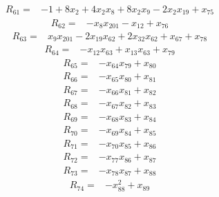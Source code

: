 {\begin{align*}
R_{61} ={}& -1 + 8x_{2} + 4x_{2} x_{8} + 8x_{2} x_{9} - 2x_{2} x_{19} + x_{75}
\end{align*}
\begin{align*}
R_{62} ={}& -x_{8} x_{201} - x_{12} + x_{76}
\end{align*}
\begin{align*}
R_{63} ={}& x_{9} x_{201} - 2x_{19} x_{62} + 2x_{32} x_{62} + x_{67} + x_{78}
\end{align*}
\begin{align*}
R_{64} ={}& -x_{12} x_{63} + x_{13} x_{63} + x_{79}
\end{align*}
\begin{align*}
R_{65} ={}& -x_{64} x_{79} + x_{80}
\end{align*}
\begin{align*}
R_{66} ={}& -x_{65} x_{80} + x_{81}
\end{align*}
\begin{align*}
R_{67} ={}& -x_{66} x_{81} + x_{82}
\end{align*}
\begin{align*}
R_{68} ={}& -x_{67} x_{82} + x_{83}
\end{align*}
\begin{align*}
R_{69} ={}& -x_{68} x_{83} + x_{84}
\end{align*}
\begin{align*}
R_{70} ={}& -x_{69} x_{84} + x_{85}
\end{align*}
\begin{align*}
R_{71} ={}& -x_{70} x_{85} + x_{86}
\end{align*}
\begin{align*}
R_{72} ={}& -x_{77} x_{86} + x_{87}
\end{align*}
\begin{align*}
R_{73} ={}& -x_{78} x_{87} + x_{88}
\end{align*}
\begin{align*}
R_{74} ={}& -x_{88}^{2} + x_{89}
\end{align*}
}
